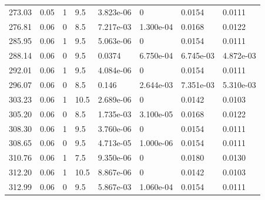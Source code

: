 \documentclass[preview]{standalone}
\begin{document}
{{{\begin{tabular}{L{1.2cm}C{1.2cm} C{0.3cm}C{0.5cm} C{1.4cm}C{1.4cm} C{1.4cm}C{1.4cm}}
  273.03  &  0.05  & 1     & 9.5 &  3.823e-06  & 0  & 0.0154 &  0.0111   \\ 
  276.81  &  0.06  & 0     & 8.5 &  7.217e-03  & 1.300e-04  & 0.0168 &  0.0122   \\ 
  285.95  &  0.06  & 1     & 9.5 &  5.063e-06  & 0  & 0.0154 &  0.0111   \\ 
  288.14  &  0.06  & 0     & 9.5 &  0.0374  & 6.750e-04  & 6.745e-03 &  4.872e-03   \\ 
  292.01  &  0.06  & 1     & 9.5 &  4.084e-06  & 0  & 0.0154 &  0.0111   \\ 
  296.07  &  0.06  & 0     & 8.5 &  0.146  & 2.644e-03  & 7.351e-03 &  5.310e-03   \\ 
  303.23  &  0.06  & 1     & 10.5 &  2.689e-06  & 0  & 0.0142 &  0.0103   \\ 
  305.20  &  0.06  & 0     & 8.5 &  1.735e-03  & 3.100e-05  & 0.0168 &  0.0122   \\ 
  308.30  &  0.06  & 1     & 9.5 &  3.760e-06  & 0  & 0.0154 &  0.0111   \\ 
  308.65  &  0.06  & 0     & 9.5 &  4.713e-05  & 1.000e-06  & 0.0154 &  0.0111   \\ 
  310.76  &  0.06  & 1     & 7.5 &  9.350e-06  & 0  & 0.0180 &  0.0130   \\ 
  312.20  &  0.06  & 1     & 10.5 &  8.867e-06  & 0  & 0.0142 &  0.0103   \\ 
  312.99  &  0.06  & 0     & 9.5 &  5.867e-03  & 1.060e-04  & 0.0154 &  0.0111   \\ 
\hline 
\end{tabular} 

}}}
\end{document}
